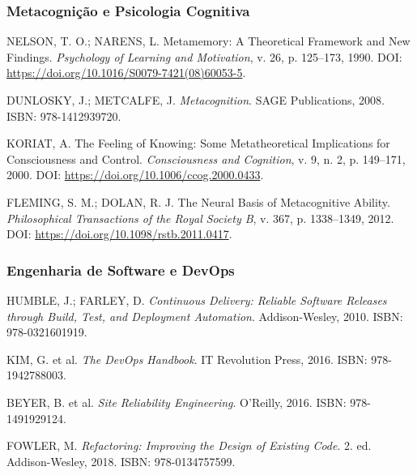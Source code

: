 \subsubsection{Metacognição e Psicologia Cognitiva}

\begin{enumerate}[leftmargin=*, label={[R\arabic*]}, resume]
  \item NELSON, T. O.; NARENS, L. Metamemory: A Theoretical Framework and New Findings. \textit{Psychology of Learning and Motivation}, v. 26, p. 125--173, 1990. DOI: \url{https://doi.org/10.1016/S0079-7421(08)60053-5}.
  
  \item DUNLOSKY, J.; METCALFE, J. \textit{Metacognition}. SAGE Publications, 2008. ISBN: 978-1412939720.
  
  \item KORIAT, A. The Feeling of Knowing: Some Metatheoretical Implications for Consciousness and Control. \textit{Consciousness and Cognition}, v. 9, n. 2, p. 149--171, 2000. DOI: \url{https://doi.org/10.1006/ccog.2000.0433}.
  
  \item FLEMING, S. M.; DOLAN, R. J. The Neural Basis of Metacognitive Ability. \textit{Philosophical Transactions of the Royal Society B}, v. 367, p. 1338--1349, 2012. DOI: \url{https://doi.org/10.1098/rstb.2011.0417}.
\end{enumerate}

\subsubsection{Engenharia de Software e DevOps}

\begin{enumerate}[leftmargin=*, label={[R\arabic*]}, resume]
  \item HUMBLE, J.; FARLEY, D. \textit{Continuous Delivery: Reliable Software Releases through Build, Test, and Deployment Automation}. Addison-Wesley, 2010. ISBN: 978-0321601919.
  
  \item KIM, G. et al. \textit{The DevOps Handbook}. IT Revolution Press, 2016. ISBN: 978-1942788003.
  
  \item BEYER, B. et al. \textit{Site Reliability Engineering}. O'Reilly, 2016. ISBN: 978-1491929124.
  
  \item FOWLER, M. \textit{Refactoring: Improving the Design of Existing Code}. 2. ed. Addison-Wesley, 2018. ISBN: 978-0134757599.
\end{enumerate}

